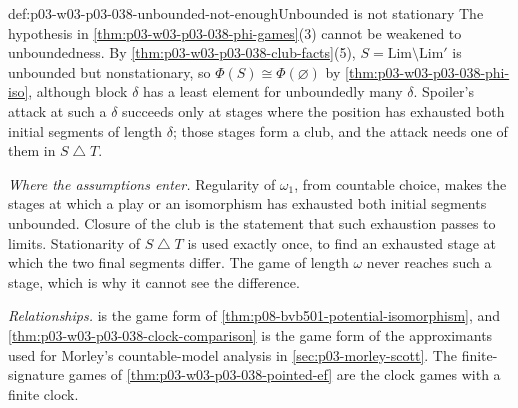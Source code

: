 \begin{hbwarning}{def:p03-w03-p03-038-unbounded-not-enough}{Unbounded is not stationary}
The hypothesis in \cref{thm:p03-w03-p03-038-phi-games}(3) cannot be
weakened to unboundedness. By \cref{thm:p03-w03-p03-038-club-facts}(5),
\(S=\mathrm{Lim}\setminus\mathrm{Lim}'\) is unbounded but nonstationary, so
\(\Phi(S)\cong\Phi(\varnothing)\) by \cref{thm:p03-w03-p03-038-phi-iso},
although block \(\delta\) has a least element for unboundedly many
\(\delta\). Spoiler's attack at such a \(\delta\) succeeds only at stages
where the position has exhausted both initial segments of length
\(\delta\); those stages form a club, and the attack needs one of them in
\(S\mathbin{\triangle}T\).
\end{hbwarning}

\emph{Where the assumptions enter.} Regularity of \(\omega_1\), from
countable choice, makes the stages at which a play or an isomorphism has
exhausted both initial segments unbounded. Closure of the club is the
statement that such exhaustion passes to limits. Stationarity of
\(S\mathbin{\triangle}T\) is used exactly once, to find an exhausted stage
at which the two final segments differ. The game of length \(\omega\) never
reaches such a stage, which is why it cannot see the difference.

\emph{Relationships.}  is the
game form of \cref{thm:p08-bvb501-potential-isomorphism}, and
\cref{thm:p03-w03-p03-038-clock-comparison} is the game form of the
approximants used for Morley's countable-model analysis in
\cref{sec:p03-morley-scott}. The finite-signature games of
\cref{thm:p03-w03-p03-038-pointed-ef} are the clock games with a finite
clock.
